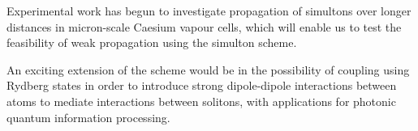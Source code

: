   Experimental work has begun to investigate propagation of simultons over
  longer distances in micron-scale Caesium vapour cells, which will enable us to
  test the feasibility of weak propagation using the simulton scheme. 

  An exciting extension of the scheme would be in the possibility of coupling
  using Rydberg states in order to introduce strong dipole-dipole interactions
  between atoms to mediate interactions between solitons, with applications for
  photonic quantum information
  processing.\cite{Maxwell2013,Maghrebi2015,Peyronel2012}
